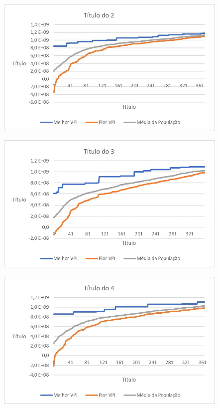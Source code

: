 \documentclass[12pt,a4paper]{report}
\begin{document}
\begin{figure}[H]
\centering

\includegraphics[scale=1]{ApE/AGRPCO2/2}

\end{figure}

\begin{figure}[H]
\centering

\includegraphics[scale=1]{ApE/AGRPCO2/3}

\end{figure}

\begin{figure}[H]
\centering

\includegraphics[scale=1]{ApE/AGRPCO2/4}

\end{figure}
\end{document}
